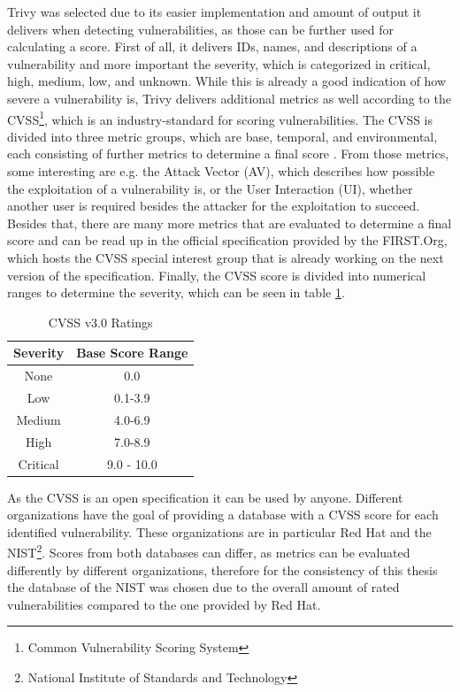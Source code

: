 Trivy was selected due to its easier implementation and amount of output it delivers when detecting vulnerabilities, as those can be further used for calculating a score. First of all, it delivers IDs, names, and descriptions of a vulnerability and more important the severity, which is categorized in critical, high, medium, low, and unknown. While this is already a good indication of how severe a vulnerability is, Trivy delivers additional metrics as well according to the CVSS\footnote{Common Vulnerability Scoring System}, which is an industry-standard for scoring vulnerabilities. The CVSS is divided into three metric groups, which are base, temporal, and environmental, each consisting of further metrics to determine a final score .
From those metrics, some interesting are e.g. the Attack Vector (AV), which describes how possible the exploitation of a vulnerability is, or the User Interaction (UI), whether another user is required besides the attacker for the exploitation to succeed. Besides that, there are many more metrics that are evaluated to determine a final score and can be read up in the official specification provided by the FIRST.Org, which hosts the CVSS special interest group that is already working on the next version of the specification.
Finally, the CVSS score is divided into numerical ranges to determine the severity, which can be seen in table \ref{cvss_table}.
\begin{table}[h!]
    \centering
    \begin{tabular}{ |c|c| }
    \hline
    Severity & Base Score Range \\
    \hline
         None & 0.0 \\
         Low & 0.1-3.9\\
         Medium & 4.0-6.9\\
         High & 7.0-8.9\\
         Critical & 9.0 - 10.0\\
    \hline
    \end{tabular}
    \caption{CVSS v3.0 Ratings}
    \label{cvss_table}
\end{table}

As the CVSS is an open specification it can be used by anyone. Different organizations have the goal of providing a database with a CVSS score for each identified vulnerability. These organizations are in particular Red Hat and the NIST\footnote{National Institute of Standards and Technology}. Scores from both databases can differ, as metrics can be evaluated differently by different organizations, therefore for the consistency of this thesis the database of the NIST was chosen due to the overall amount of rated vulnerabilities compared to the one provided by Red Hat.
